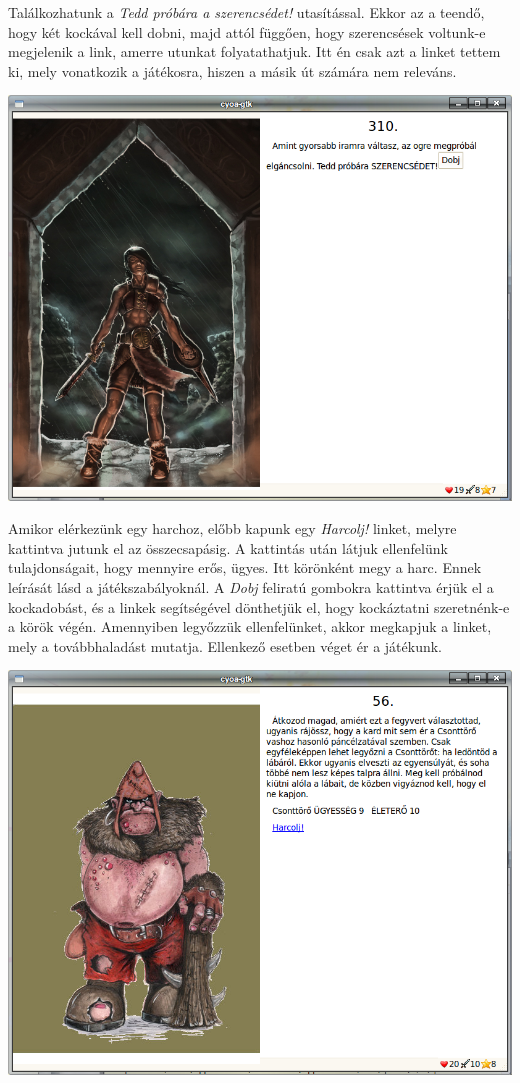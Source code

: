 \documentclass[12pt,a4paper,oneside]{report}
\begin{document}
        Találkozhatunk a \emph{Tedd próbára a szerencsédet!}
        utasítással. Ekkor az a teendő, hogy két kockával kell dobni,
        majd attól függően, hogy szerencsések voltunk-e megjelenik a
        link, amerre utunkat folyatathatjuk. Itt én csak azt a linket
        tettem ki, mely vonatkozik a játékosra, hiszen a másik út
        számára nem releváns.

        \includegraphics[scale=0.5]{screenshot_006.png}

        Amikor elérkezünk egy harchoz, előbb kapunk egy \emph{Harcolj!}
        linket, melyre kattintva jutunk el az összecsapásig. A
        kattintás után látjuk ellenfelünk tulajdonságait, hogy
        mennyire erős, ügyes. Itt körönként megy a harc. Ennek
        leírását lásd a játékszabályoknál. A \emph{Dobj} feliratú gombokra
        kattintva érjük el a kockadobást, és a linkek segítségével
        dönthetjük el, hogy kockáztatni szeretnénk-e a körök
        végén. Amennyiben legyőzzük ellenfelünket, akkor megkapjuk a
        linket, mely a továbbhaladást mutatja. Ellenkező esetben véget
        ér a játékunk.

        \includegraphics[scale=0.5]{screenshot_011.png}
\end{document}
